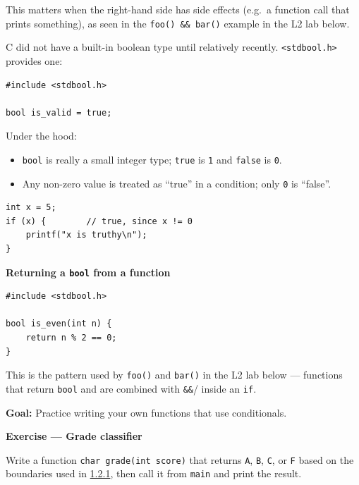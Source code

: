 \documentclass[11pt,a4paper]{article}
\providecommand{\tightlist}{\setlength{\itemsep}{0pt}\setlength{\parskip}{0pt}}
\begin{document}
This matters when the right-hand side has side effects (e.g.~a function call that prints something), as seen in the \texttt{foo()\ \&\&\ bar()} example in the L2 lab below.

\label{123-boolean-operators}
\hypertarget{123-boolean-operators}{}

C did not have a built-in boolean type until relatively recently. \texttt{\textless{}stdbool.h\textgreater{}} provides one:

\begin{lstlisting}[style=cscode]
#include <stdbool.h>

bool is_valid = true;
\end{lstlisting}

Under the hood:

\begin{itemize}
\tightlist
\item
  \texttt{bool} is really a small integer type; \texttt{true} is \texttt{1} and \texttt{false} is \texttt{0}.
\item
  Any non-zero value is treated as ``true'' in a condition; only \texttt{0} is ``false''.
\end{itemize}

\begin{lstlisting}[style=cscode]
int x = 5;
if (x) {        // true, since x != 0
    printf("x is truthy\n");
}
\end{lstlisting}

\textbf{Returning a \texttt{bool} from a function}

\begin{lstlisting}[style=cscode]
#include <stdbool.h>

bool is_even(int n) {
    return n % 2 == 0;
}
\end{lstlisting}

This is the pattern used by \texttt{foo()} and \texttt{bar()} in the L2 lab below --- functions that return \texttt{bool} and are combined with \texttt{\&\&}/\texttt{\textbar{}\textbar{}} inside an \texttt{if}.

\label{1x-lab}
\hypertarget{1x-lab}{}

\textbf{Goal:} Practice writing your own functions that use conditionals.

\textbf{Exercise --- Grade classifier}

Write a function \texttt{char\ grade(int\ score)} that returns \texttt{\textquotesingle{}A\textquotesingle{}}, \texttt{\textquotesingle{}B\textquotesingle{}}, \texttt{\textquotesingle{}C\textquotesingle{}}, or \texttt{\textquotesingle{}F\textquotesingle{}} based on the boundaries used in \protect\hyperlink{121-ifelse-constructs}{1.2.1}, then call it from \texttt{main} and print the result.
\end{document}
